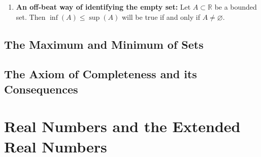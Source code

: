 \begin{enumerate}[label=\textbf{\arabic*.}]
\begin{enumerate}
\begin{Trick}{Vacuous Truth}
\begin{enumerate}
            \end{enumerate}
            Both of them make no sense as there are no students to begin with, and neither statement can be proved nor disproved. Here, $x$ denotes the students, $P(x)$ denotes the number of students, and $Q(x)$ denotes the presence of the students. So, vacuously, $P(x)\implies Q(x)$ is true for all $x\in S$, meaning that a class having $0$ students implies that all students were present is a vacuously true statement.
        \end{Trick}
        \item Now, if you have managed to solve the first step, then we need to find such numbers that are less than the upper bounds and greater than the lower bounds for determining the supremum and infimum, respectively. Do such numbers exist?
        \item If such numbers do exist, then our work is done, but if they do not exist, then what concept do we need to introduce? After introducing that concept, can it be regarded as a member of the field of real numbers?
    \end{enumerate}
    This whole exercise is a foreshadowing of a very important concept that we will see in this chapter.
    \item \textbf{An off-beat way of identifying the empty set:} Let $A\subset\mathbb{R}$ be a bounded set. Then $\inf(A)\leq\sup(A)$ will be true if and only if $A\neq\varnothing$. 
\end{enumerate}
\subsection{The Maximum and Minimum of Sets}
\subsection{The Axiom of Completeness and its Consequences}
\section{Real Numbers and the Extended Real Numbers}
